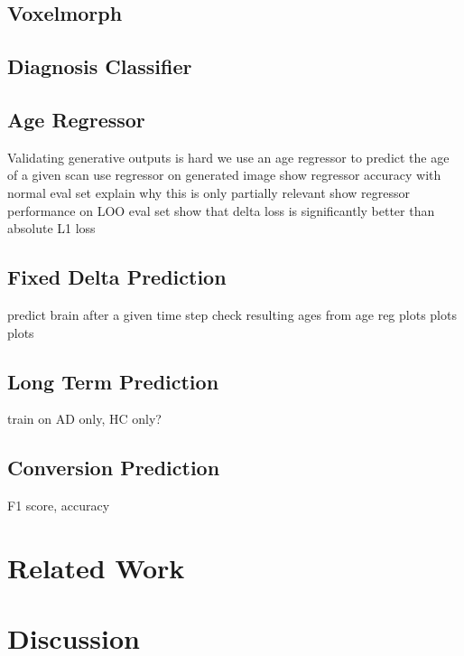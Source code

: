 \section{Voxelmorph}


\section{Diagnosis Classifier}

\section{Age Regressor}

Validating generative outputs is hard
we use an age regressor to predict the age of a given scan
use regressor on generated image
show regressor accuracy with normal eval set
explain why this is only partially relevant
show regressor performance on LOO eval set
show that delta loss is significantly better than absolute L1 loss

\section{Fixed Delta Prediction}
predict brain after a given time step
check resulting ages from age reg
plots plots plots

\section{Long Term Prediction}
train on AD only, HC only?

\section{Conversion Prediction}
F1 score, accuracy

\chapter{Related Work}

\chapter{Discussion}
